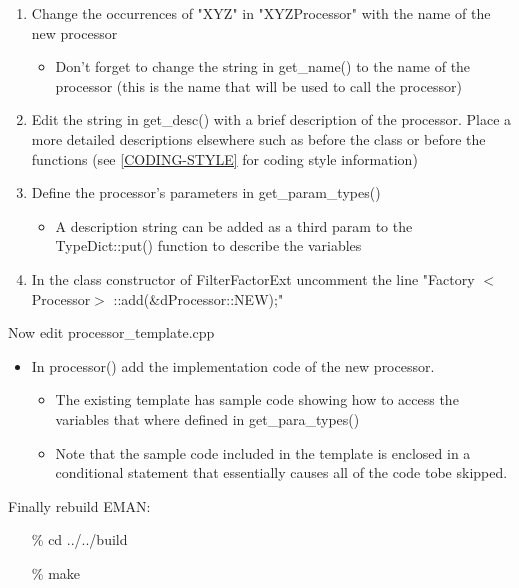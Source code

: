       \begin{enumerate}
	\item
	  Change the occurrences of "XYZ" in "XYZProcessor" with the name of
	  the new processor
	  \begin{itemize}
	    \item
	      Don't forget to change the string in get_name() to the name of
	      the processor (this is the name that will be used to
	      call the processor)
	  \end{itemize}
	\item
	  Edit the string in get_desc() with a brief description of the
	  processor.  Place a more detailed descriptions elsewhere such as
          before the class or before the functions (see
	  \ref{CODING-STYLE} for coding style information)
	\item
	  Define the processor's parameters in get_param_types()
	  \begin{itemize}
	    \item
	      A description string can be added as a third param to the
	      TypeDict::put() function to describe the variables 
	  \end{itemize}
	\item
	  In the class constructor of FilterFactorExt uncomment the line
	  "Factory $<$Processor$>$ ::add(\&dProcessor::NEW);"
      \end{enumerate}

      Now edit processor_template.cpp
      
      \begin{itemize}
	\item
	  In processor() add the implementation code of the new
	  processor.
	  \begin{itemize}
	    \item
	      The existing template has sample code showing how to access the
	      variables that where defined in get_para_types()
	    \item
	      Note that the sample code included in the template is enclosed in
	      a conditional statement that essentially causes all of
	      the code tobe skipped.
	  \end{itemize}
      \end{itemize}

      Finally rebuild EMAN:
      \begin{itemize}
	\item[\%] cd ../../build
	\item[\%] make
      \end{itemize}

